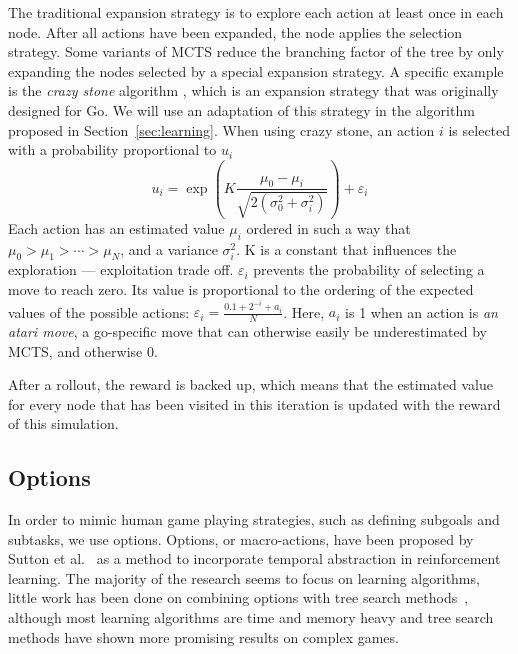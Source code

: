 The traditional expansion strategy is to explore each action at least once in
each node. After all actions have been expanded, the node applies the selection
strategy. Some variants of MCTS reduce the branching
factor of the tree by only expanding the nodes selected by a special expansion
strategy. A specific example is the \emph{crazy stone} algorithm
\cite{coulom2007efficient}, which is an expansion strategy that was originally
designed for Go. We will use an adaptation of this strategy in the algorithm
proposed in Section~\ref{sec:learning}.  When using crazy stone, an action $i$
is selected with a probability proportional to $u_i$ \begin{equation}
\label{eq:crazystone} u_i = \exp\left(K \frac{\mu_0 -
\mu_i}{\sqrt{2\left(\sigma_0^2 + \sigma_i^2\right)}}\right) + \varepsilon_i
\end{equation} Each action has an estimated value $\mu_i$ ordered in such a way
that $\mu_0 > \mu_1 > \cdots > \mu_N$, and a variance $\sigma_i^2$. K is a
constant that influences the exploration --- exploitation trade off.
$\varepsilon_i$ prevents the probability of selecting a move to reach zero. Its
value is proportional to the ordering of the expected values of the possible
actions: $\varepsilon_i = \frac{0.1 + 2^{-i} + a_i}{N}$\@.  Here, $a_i$ is 1
when an action is \emph{an atari move}, a go-specific move that can otherwise
easily be underestimated by MCTS, and otherwise 0.

After a rollout, the reward is backed up, which means that the estimated value
for every node that has been visited in this iteration is updated with the
reward of this simulation. 

\subsection{Options}
\label{subsec:options}

In order to mimic human game playing strategies, such as defining subgoals and
subtasks, we use options. Options, or macro-actions, have been proposed by
Sutton et al.~\cite{sutton1999between} as a method to incorporate temporal
abstraction in reinforcement learning. The majority of the research seems to
focus on learning algorithms, little work has been done on combining options
with tree search methods~\cite{barto2003recent}, although most learning
algorithms are time and memory heavy and tree search methods have shown more
promising results on complex games.

